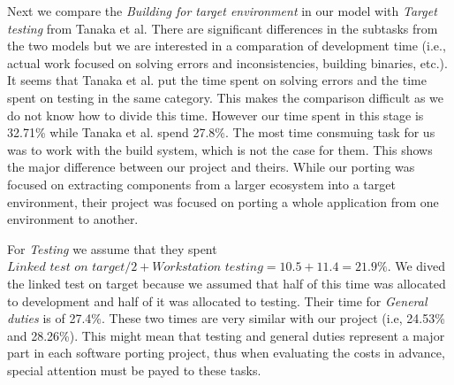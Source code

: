 Next we compare the \textit{Building for target environment} in our model with
\textit{Target testing} from Tanaka et al. There are significant differences in
the subtasks from the two models but we are interested in a comparation of
development time (i.e., actual work focused on solving errors and
inconsistencies, building binaries, etc.). It seems that Tanaka et al. put the
time spent on solving errors and the time spent on testing in the same category.
This makes the comparison difficult as we do not know how to divide this time.
However our time spent in this stage is 32.71\% while Tanaka et al. spend
27.8\%. The most time consmuing task for us was to work with the build system,
which is not the case for them. This shows the major difference between our
project and theirs. While our porting was focused on extracting components from
a larger ecosystem into a target environment, their project was focused on
porting a whole application from one environment to another.

For \textit{Testing} we assume that they spent $\textit{Linked test on target} /
2 + \textit{Workstation testing} = 10.5 + 11.4 = 21.9\%$. We dived the linked
test on target because we assumed that half of this time was allocated to
development and half of it was allocated to testing. Their time for
\textit{General duties} is of 27.4\%. These two times are very similar with our
project (i.e, 24.53\% and 28.26\%). This might mean that testing and general
duties represent a major part in each software porting project, thus when
evaluating the costs in advance, special attention must be payed to these tasks.
